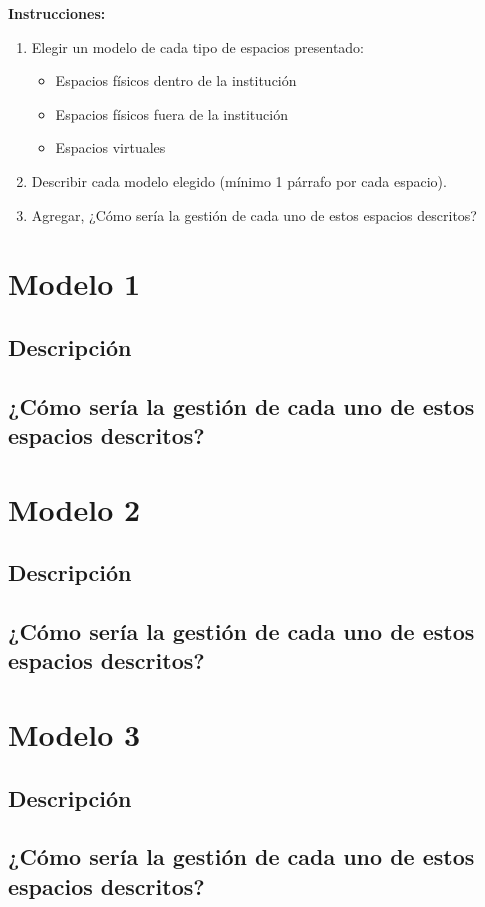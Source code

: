 




\textbf{Instrucciones:}\bigbreak

\begin{enumerate}
    \item Elegir un modelo de cada tipo de espacios presentado: 
    \begin{itemize}
        \item Espacios físicos dentro de la institución
        \item Espacios físicos fuera de la institución
        \item Espacios virtuales
    \end{itemize}

    \item Describir cada modelo elegido  (mínimo 1 párrafo por cada espacio).
    \item Agregar, ¿Cómo sería la gestión de cada uno de estos espacios descritos?
    
\end{enumerate}

\section{Modelo 1}
\subsection{Descripción}
\subsection{¿Cómo sería la gestión de cada uno de estos espacios descritos?}

\section{Modelo 2}
\subsection{Descripción}
\subsection{¿Cómo sería la gestión de cada uno de estos espacios descritos?}

\section{Modelo 3}
\subsection{Descripción}
\subsection{¿Cómo sería la gestión de cada uno de estos espacios descritos?}
%
%


